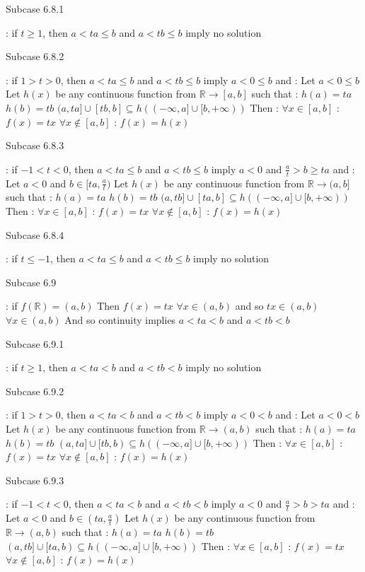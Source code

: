 \begin{solution}
\begin{bolded}Subcase 6.8.1\end{bolded} : if $t\ge 1$, then $a< ta\le b$ and $a< tb\le b$ imply no solution

\begin{bolded}Subcase 6.8.2\end{bolded} : if $1>t>0$, then $a< ta\le b$ and $a< tb\le b$ imply $a<0\le b$ and :
Let $a< 0\le b$
Let $h(x)$ be any continuous function from $\mathbb R\to[a,b]$ such that :
$h(a)=ta$
$h(b)=tb$
$(a,ta]\cup[tb,b]\subseteq h((-\infty,a]\cup[b,+\infty))$
Then :
$\forall x\in[a,b]$ : $f(x)=tx$
$\forall x\notin[a,b]$ : $f(x)=h(x)$

\begin{bolded}Subcase 6.8.3\end{bolded} : if $-1<t<0$, then $a< ta\le b$ and $a< tb\le b$ imply $a< 0$ and $\frac at> b\ge ta$ and :
Let $a< 0$ and $b\in[ta,\frac at)$
Let $h(x)$ be any continuous function from $\mathbb R\to(a,b]$ such that :
$h(a)=ta$
$h(b)=tb$
$(a,tb]\cup[ta,b]\subseteq h((-\infty,a]\cup[b,+\infty))$
Then :
$\forall x\in[a,b]$ : $f(x)=tx$
$\forall x\notin[a,b]$ : $f(x)=h(x)$

\begin{bolded}Subcase 6.8.4\end{bolded} : if $t\le -1$, then $a< ta\le b$ and $a< tb\le b$ imply no solution

\begin{bolded}Subcase 6.9\end{bolded} : if $f(\mathbb R)=(a,b)$
Then $f(x)=tx$ $\forall x\in (a,b)$ and so $tx\in(a,b)$ $\forall x\in(a,b)$
And so continuity implies $a< ta< b$ and $a< tb< b$

\begin{bolded}Subcase 6.9.1\end{bolded} : if $t\ge 1$, then $a< ta<b$ and $a< tb< b$ imply no solution

\begin{bolded}Subcase 6.9.2\end{bolded} : if $1>t>0$, then $a< ta<b$ and $a< tb< b$ imply $a< 0< b$ and :
Let $a< 0< b$
Let $h(x)$ be any continuous function from $\mathbb R\to(a,b)$ such that :
$h(a)=ta$
$h(b)=tb$
$(a,ta]\cup[tb,b)\subseteq h((-\infty,a]\cup[b,+\infty))$
Then :
$\forall x\in[a,b]$ : $f(x)=tx$
$\forall x\notin[a,b]$ : $f(x)=h(x)$

\begin{bolded}Subcase 6.9.3\end{bolded} : if $-1< t<0$, then $a< ta<b$ and $a< tb< b$ imply $a< 0$ and $\frac at> b> ta$ and :
Let $a<0$ and $b\in(ta,\frac at)$
Let $h(x)$ be any continuous function from $\mathbb R\to(a,b)$ such that :
$h(a)=ta$
$h(b)=tb$
$(a,tb]\cup[ta,b)\subseteq h((-\infty,a]\cup[b,+\infty))$
Then :
$\forall x\in[a,b]$ : $f(x)=tx$
$\forall x\notin[a,b]$ : $f(x)=h(x)$


\end{solution}
